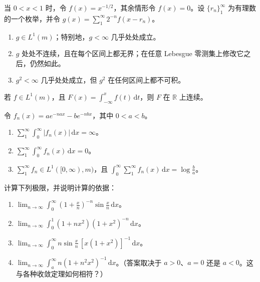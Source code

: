 \documentclass[../../main.tex]{subfiles}%
\begin{document}
\begin{exercise}\label{exercise:ch02-dense-singularities}
当 $0<x<1$ 时，令 $f(x)=x^{-1/2}$，其余情形令 $f(x)=0$。设 $\{r_n\}_1^\infty$ 为有理数的一个枚举，并令 $g(x)=\sum_1^\infty2^{-n}f(x-r_n)$。
\begin{enumerate}
\item\label{item:ch02-dense-singularities-integrable} $g\in L^1(m)$；特别地，$g<\infty$ 几乎处处成立。
\item\label{item:ch02-dense-singularities-unbounded} $g$ 处处不连续，且在每个区间上都无界；在任意 Lebesgue 零测集上修改它之后，仍然如此。
\item\label{item:ch02-dense-singularities-square} $g^2<\infty$ 几乎处处成立，但 $g^2$ 在任何区间上都不可积。
\end{enumerate}
\end{exercise}
\begin{exercise}\label{exercise:ch02-indefinite-continuity}
若 $f\in L^1(m)$，且 $F(x)=\int_{-\infty}^x f(t)\,\mathrm{d}t$，则 $F$ 在 $\mathbb{R}$ 上连续。
\end{exercise}
\begin{exercise}\label{exercise:ch02-series-interchange-failure}
令 $f_n(x)=ae^{-nax}-be^{-nbx}$，其中 $0<a<b$。
\begin{enumerate}
\item\label{item:ch02-series-absolute-divergence} $\sum_1^\infty\int_0^\infty|f_n(x)|\,\mathrm{d}x=\infty$。
\item\label{item:ch02-sum-integrals-zero} $\sum_1^\infty\int_0^\infty f_n(x)\,\mathrm{d}x=0$。
\item\label{item:ch02-integral-sum-log} $\sum_1^\infty f_n\in L^1([0,\infty),m)$，且 $\int_0^\infty\sum_1^\infty f_n(x)\,\mathrm{d}x=\log\frac{b}{a}$。
\end{enumerate}
\end{exercise}
\begin{exercise}\label{exercise:ch02-compute-limits}
计算下列极限，并说明计算的依据：
\begin{enumerate}
\item\label{item:ch02-limit-exponential-sine} $\displaystyle\lim_{n\to\infty}\int_0^\infty\left(1+\frac{x}{n}\right)^{-n}\sin\frac{x}{n}\,\mathrm{d}x$。
\item\label{item:ch02-limit-rational-powers} $\displaystyle\lim_{n\to\infty}\int_0^1(1+nx^2)(1+x^2)^{-n}\,\mathrm{d}x$。
\item\label{item:ch02-limit-sine-rational} $\displaystyle\lim_{n\to\infty}\int_0^\infty n\sin\frac{x}{n}\,[x(1+x^2)]^{-1}\,\mathrm{d}x$。
\item\label{item:ch02-limit-cauchy-kernel} $\displaystyle\lim_{n\to\infty}\int_a^\infty n(1+n^2x^2)^{-1}\,\mathrm{d}x$。（答案取决于 $a>0$、$a=0$ 还是 $a<0$。这与各种收敛定理如何相符？）
\end{enumerate}
\end{exercise}
\end{document}
